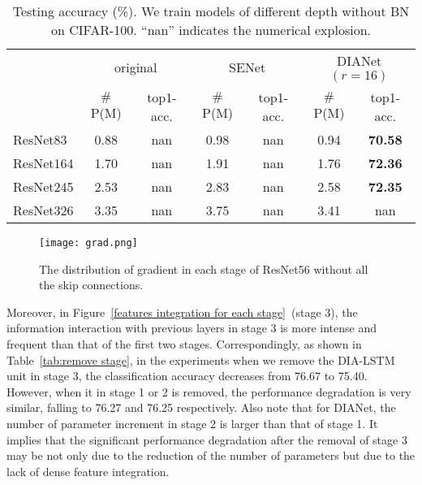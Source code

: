 \documentclass[letterpaper]{article} \usepackage{aaai20}  \usepackage{times}  \usepackage{helvet} \usepackage{courier}  \usepackage[hyphens]{url}  \usepackage{graphicx} \urlstyle{rm} \def\UrlFont{\rm}  \usepackage{graphicx}  \frenchspacing  \setlength{\pdfpagewidth}{8.5in}  \setlength{\pdfpageheight}{11in}  \usepackage{color}
\begin{document}
\begin{table*}[ht]
		\small
		\centering
		\begin{tabular}{|l|c|c|c|c|c|c|}
			\toprule
			& \multicolumn{2}{c|}{original} & \multicolumn{2}{c|}{SENet} & \multicolumn{2}{c|}{DIANet$(r=16)$} \\
			\cmidrule{2-7}          & $\#$P(M) & top1-acc. & $\#$P(M) & top1-acc. & $\#$P(M) & top1-acc. \\
			\midrule
			ResNet83 & 0.88  & nan   & 0.98  & nan   & 0.94  & \textbf{70.58 } \\
			ResNet164 & 1.70  & nan   & 1.91  & nan   & 1.76  & \textbf{72.36 } \\
			ResNet245 & 2.53  & nan   & 2.83  & nan   & 2.58  & \textbf{72.35 } \\
			ResNet326 & 3.35  & nan   & 3.75  & nan   & 3.41  & nan \\
			\bottomrule
		\end{tabular}\caption{Testing accuracy (\%). We train models of different depth without BN on CIFAR-100. ``nan'' indicates the numerical explosion. }
		\label{tab:withoutbn}\end{table*}\begin{figure*}[h]
    \centering
    \texttt{[image: grad.png]}
    \caption{The distribution of gradient in each stage of ResNet56 without all the skip connections.}
    \label{fig:gradient}
\end{figure*}
	Moreover, in Figure~\ref{features integration for each stage}~(stage 3), the information interaction with previous layers in stage 3 is more intense and frequent than that of the first two stages. Correspondingly, as shown in Table~\ref{tab:remove stage}, in the experiments when we remove the DIA-LSTM unit in stage 3, the classification accuracy decreases from 76.67 to 75.40. However, when it in stage 1 or 2 is removed, the performance degradation is very similar, falling to 76.27 and 76.25 respectively. Also note that for DIANet, the number of parameter increment in stage 2 is larger than that of stage 1. It implies that the significant performance degradation after the removal of stage 3 may be not only due to the reduction of the number of parameters but due to the lack of dense feature integration.
\end{document}

